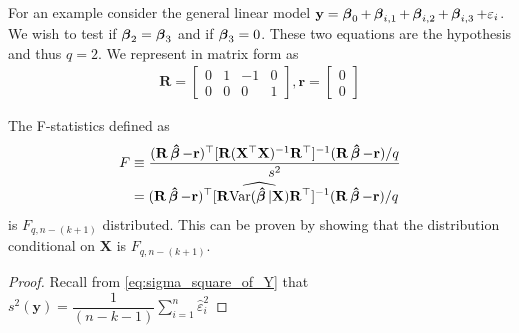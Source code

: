 For an example consider the general linear model $\mathbf{y} = \operatorname{\boldsymbol{\beta}}_0 + \operatorname{\boldsymbol{\beta}}_{i,1} + \operatorname{\boldsymbol{\beta}}_{i,2} + \operatorname{\boldsymbol{\beta}}_{i,3} + \varepsilon_i$. We wish to test if $\operatorname{\boldsymbol{\beta}}_2 = \operatorname{\boldsymbol{\beta}}_3$ and if $\operatorname{\boldsymbol{\beta}}_3 = 0$. These two equations are the hypothesis and thus $q = 2$. We represent in matrix form as
\begin{align*}
    \mathbf{R} = \begin{bmatrix}0 & 1 & -1 & 0\\
    0 & 0 & 0 & 1\end{bmatrix}, \mathbf{r} = \begin{bmatrix}0\\0\end{bmatrix}
\end{align*}

The F-statistics defined as
\begin{align*}
    F &\equiv \dfrac{(\mathbf{R}\operatorname{\boldsymbol{\hat{\beta}}} - \mathbf{r})^\top  [\mathbf{R}(\mathbf{X}^\top \mathbf{X})^{-1}\mathbf{R}^\top]^{-1}  (\mathbf{R}\operatorname{\boldsymbol{\hat{\beta}}}- \mathbf{r}) / q}{s^2}\\
    &= (\mathbf{R}\operatorname{\boldsymbol{\hat{\beta}}} - \mathbf{r})^\top  [\mathbf{R}\widehat{\operatorname{\text{Var}}(\operatorname{\boldsymbol{\hat{\beta}}} | \mathbf{X})}\mathbf{R}^\top]^{-1}  (\mathbf{R}\operatorname{\boldsymbol{\hat{\beta}}}- \mathbf{r}) / q
\end{align*}
is $F_{q, n - (k+1)}$ distributed. This can be proven by showing that the distribution conditional on $\mathbf{X}$ is $F_{q, n - (k+1)}$. 
\begin{proof}
Recall from \eqref{eq:sigma_square_of_Y} that $s^2(\textbf{y}) = \dfrac{1}{(n-k-1)}\sum_{i=1}^n \hat{\varepsilon}_i^2$

\end{proof}







